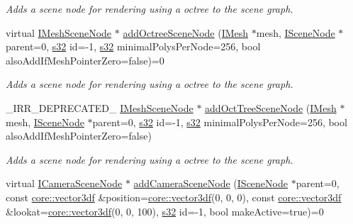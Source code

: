 \begin{DoxyCompactItemize}
\begin{DoxyCompactList}\small\item\em Adds a scene node for rendering using a octree to the scene graph. \end{DoxyCompactList}\item 
virtual \hyperlink{classirr_1_1scene_1_1IMeshSceneNode}{I\+Mesh\+Scene\+Node} $\ast$ \hyperlink{classirr_1_1scene_1_1ISceneManager_abfa8d1ebb1ff681d588aea98e6e2b193}{add\+Octree\+Scene\+Node} (\hyperlink{classirr_1_1scene_1_1IMesh}{I\+Mesh} $\ast$mesh, \hyperlink{classirr_1_1scene_1_1ISceneNode}{I\+Scene\+Node} $\ast$parent=0, \hyperlink{namespaceirr_ac66849b7a6ed16e30ebede579f9b47c6}{s32} id=-\/1, \hyperlink{namespaceirr_ac66849b7a6ed16e30ebede579f9b47c6}{s32} minimal\+Polys\+Per\+Node=256, bool also\+Add\+If\+Mesh\+Pointer\+Zero=false)=0
\begin{DoxyCompactList}\small\item\em Adds a scene node for rendering using a octree to the scene graph. \end{DoxyCompactList}\item 
\+\_\+\+I\+R\+R\+\_\+\+D\+E\+P\+R\+E\+C\+A\+T\+E\+D\+\_\+ \hyperlink{classirr_1_1scene_1_1IMeshSceneNode}{I\+Mesh\+Scene\+Node} $\ast$ \hyperlink{classirr_1_1scene_1_1ISceneManager_af2f5dfc8d5d0f525aee59058fd7457cd}{add\+Oct\+Tree\+Scene\+Node} (\hyperlink{classirr_1_1scene_1_1IMesh}{I\+Mesh} $\ast$mesh, \hyperlink{classirr_1_1scene_1_1ISceneNode}{I\+Scene\+Node} $\ast$parent=0, \hyperlink{namespaceirr_ac66849b7a6ed16e30ebede579f9b47c6}{s32} id=-\/1, \hyperlink{namespaceirr_ac66849b7a6ed16e30ebede579f9b47c6}{s32} minimal\+Polys\+Per\+Node=256, bool also\+Add\+If\+Mesh\+Pointer\+Zero=false)
\begin{DoxyCompactList}\small\item\em Adds a scene node for rendering using a octree to the scene graph. \end{DoxyCompactList}\item 
virtual \hyperlink{classirr_1_1scene_1_1ICameraSceneNode}{I\+Camera\+Scene\+Node} $\ast$ \hyperlink{classirr_1_1scene_1_1ISceneManager_afc3733849319078d5d22d94f58c7d1f2}{add\+Camera\+Scene\+Node} (\hyperlink{classirr_1_1scene_1_1ISceneNode}{I\+Scene\+Node} $\ast$parent=0, const \hyperlink{namespaceirr_1_1core_ae6e2b2a6c552833ebbd5b7463d03586b}{core\+::vector3df} \&position=\hyperlink{namespaceirr_1_1core_ae6e2b2a6c552833ebbd5b7463d03586b}{core\+::vector3df}(0, 0, 0), const \hyperlink{namespaceirr_1_1core_ae6e2b2a6c552833ebbd5b7463d03586b}{core\+::vector3df} \&lookat=\hyperlink{namespaceirr_1_1core_ae6e2b2a6c552833ebbd5b7463d03586b}{core\+::vector3df}(0, 0, 100), \hyperlink{namespaceirr_ac66849b7a6ed16e30ebede579f9b47c6}{s32} id=-\/1, bool make\+Active=true)=0

\end{DoxyCompactItemize}
